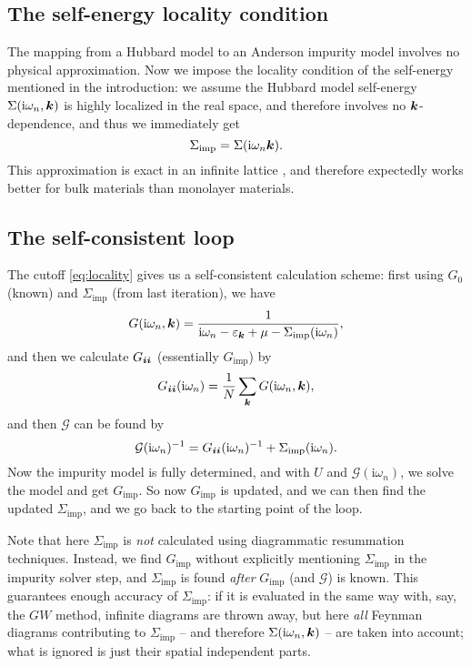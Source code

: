 \documentclass[hyperref, a4paper]{article}
\newcommand*{\ii}{\mathrm{i}}
\begin{document}
\subsection{The self-energy locality condition}

The mapping from a Hubbard model to an Anderson impurity model 
involves no physical approximation.
Now we impose the locality condition of the self-energy mentioned in the introduction:
we assume the Hubbard model self-energy $\Sigma(\ii \omega_n, \vb*{k})$ 
is highly localized in the real space,
and therefore involves no $\vb*{k}$-dependence,
and thus we immediately get 
\begin{equation}
    \Sigma_{\text{imp}} = \Sigma(\ii \omega_n \vb*{k}).
    \label{eq:locality}
\end{equation}
This approximation is exact in an infinite lattice \cite{PhysRevB.45.6479},
and therefore expectedly works better for bulk materials than monolayer materials.

\subsection{The self-consistent loop}

The cutoff \eqref{eq:locality} gives us a self-consistent calculation scheme:
first using $G_0$ (known) and $\Sigma_{\text{imp}}$ (from last iteration), we have 
\begin{equation}
    G(\ii \omega_n, \vb*{k}) = \frac{1}{\ii \omega_n - \varepsilon_{\vb*{k}} + \mu - \Sigma_{\text{imp}}(\ii \omega_n)},
\end{equation}
and then we calculate $G_{\vb*{i} \vb*{i}}$ (essentially $G_{\text{imp}}$) by 
\begin{equation}
    G_{\vb*{i} \vb*{i}}(\ii \omega_n) = \frac{1}{N} \sum_{\vb*{k}} G(\ii \omega_n, \vb*{k}),
\end{equation}
and then $\mathcal{G}$ can be found by 
\begin{equation}
    \mathcal{G}(\ii \omega_n)^{-1} = G_{\vb*{i} \vb*{i}}(\ii \omega_n)^{-1} + \Sigma_{\text{imp}}(\ii \omega_n).
\end{equation}
Now the impurity model is fully determined,
and with $U$ and $\mathcal{G}(\ii \omega_n)$, we solve the model and get $G_{\text{imp}}$.
So now $G_{\text{imp}}$ is updated,
and we can then find the updated $\Sigma_{\text{imp}}$, 
and we go back to the starting point of the loop.

Note that here $\Sigma_{\text{imp}}$ is \emph{not} calculated 
using diagrammatic resummation techniques.
Instead, we find $G_{\text{imp}}$ without explicitly mentioning $\Sigma_{\text{imp}}$ 
in the impurity solver step, 
and $\Sigma_{\text{imp}}$ is found \emph{after} $G_{\text{imp}}$ (and $\mathcal{G}$) is known.
This guarantees enough accuracy of $\Sigma_{\text{imp}}$:
if it is evaluated in the same way with, say, the $GW$ method,
infinite diagrams are thrown away,
but here \emph{all} Feynman diagrams contributing to $\Sigma_{\text{imp}}$ 
-- and therefore $\Sigma(\ii \omega_n, \vb*{k})$ -- are taken into account;
what is ignored is just their spatial independent parts.
\end{document}
